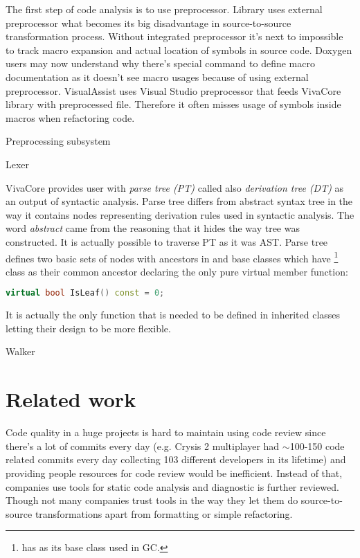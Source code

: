 The first step of code analysis is to use preprocessor. Library uses external preprocessor what becomes its big disadvantage in source-to-source transformation process. Without integrated preprocessor it's next to impossible to track macro expansion and actual location of symbols in source code. Doxygen users may now understand why there's special  command to define macro documentation as it doesn't see macro usages because of using external preprocessor. VisualAssist uses Visual Studio preprocessor that feeds VivaCore library with preprocessed file. Therefore it often misses usage of symbols inside macros when refactoring code.

Preprocessing subsystem

Lexer

VivaCore provides user with \emph{parse tree (PT)} called also \emph{derivation tree (DT)} as an output of syntactic analysis. Parse tree differs from abstract syntax tree in the way it contains nodes representing derivation rules used in syntactic analysis. The word \emph{abstract} came from the reasoning that it hides the way tree was constructed. It is actually possible to traverse PT as it was AST. Parse tree defines two basic sets of nodes with ancestors in  and  base classes which have \footnote{ has  as its base class used in GC.} class as their common ancestor declaring the only pure virtual member function:

\begin{lstlisting}[language=C++]
virtual bool IsLeaf() const = 0;
\end{lstlisting}

It is actually the only function that is needed to be defined in inherited classes letting their design to be more flexible.

Walker

\section{Related work}
Code quality in a huge projects is hard to maintain using code review since there's a lot of commits every day (e.g. Crysis 2 multiplayer had $\sim$100-150 code related commits every day collecting 103 different developers in its lifetime) and providing people resources for code review would be inefficient. Instead of that, companies use tools for static code analysis and diagnostic is further reviewed. Though not many companies trust tools in the way they let them do source-to-source transformations apart from formatting or simple refactoring.

